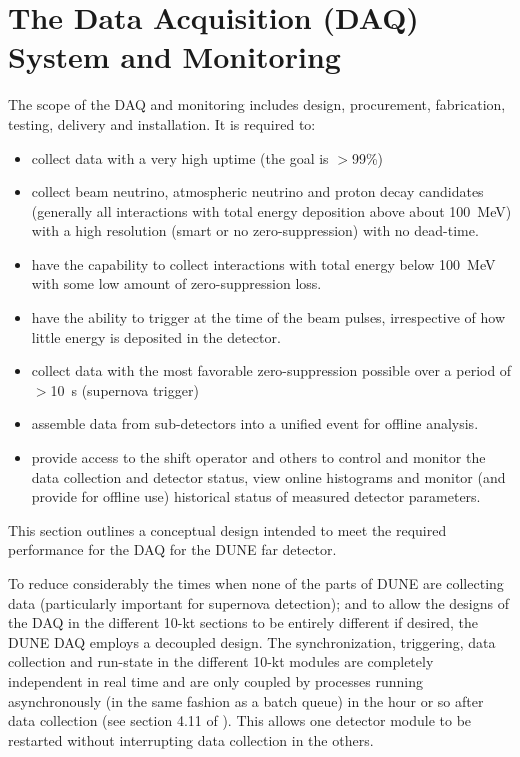 \section{The Data Acquisition (DAQ) System and Monitoring} 
\label{sec:detectors-fd-ref-daq}

The scope of the DAQ and monitoring includes design, procurement,
fabrication, testing, delivery and installation. It is required to:
\begin{itemize}
\item collect data with a very high uptime (the goal is $>$99\%)
\item collect beam neutrino, atmospheric neutrino and proton
  decay candidates (generally all interactions with total energy deposition
  above about 100~MeV) with a high resolution (smart or no
  zero-suppression) with no dead-time.
\item have the capability to collect interactions with total energy
  below 100~MeV with some
 low amount of zero-suppression loss.
\item have the ability to trigger at the time of the beam pulses,
  irrespective of how little energy is deposited in the detector.
\item collect data with the most favorable zero-suppression possible over a
  period of $>$10~s (supernova trigger)
\item assemble data from sub-detectors into a unified
  event for offline analysis.
\item provide access to the shift operator and others to control and
  monitor the data collection and detector status, view online
  histograms and monitor (and provide for offline use) historical
  status of measured detector parameters. 
\end{itemize}
This section outlines a conceptual design intended to meet the required performance for the DAQ
for the DUNE far detector. 

To reduce considerably the times when none of the parts of DUNE are
collecting data (particularly important for supernova detection); and
to allow the designs of the DAQ in the different 10-kt sections to be
entirely different if desired, the DUNE DAQ employs a decoupled 
design. 
The synchronization, triggering, data collection and run-state in the
different 10-kt modules are completely independent in real time and
are only coupled by processes running asynchronously (in the same fashion
as a batch queue) in the hour or so after data collection (see section
4.11 of \anxlbnefd).  This allows one %
detector module to be restarted without interrupting data collection in the
others. %

